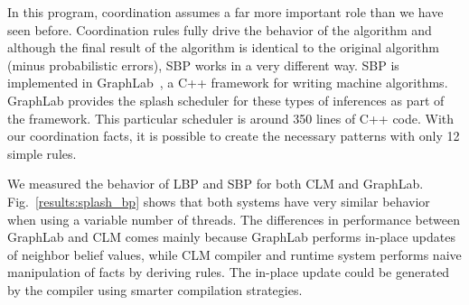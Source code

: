 \begin{dblfig}
   \begin{center}
   \end{center}
\end{dblfig}


In this program, coordination assumes a far more important role than we have
seen before. Coordination rules fully drive the behavior of the algorithm and
although the final result of the algorithm is identical to the original
algorithm (minus probabilistic errors), SBP works in a very different way.
SBP is implemented in GraphLab~\cite{GraphLab2010}, a C++ framework for writing machine algorithms.
GraphLab provides the splash scheduler for these types of inferences as part of
the framework. This particular scheduler is around 350 lines of C++ code.
With our coordination facts, it is possible to create the necessary
patterns with only 12 simple rules.

We measured the behavior of LBP and SBP for both CLM and GraphLab.
Fig.~\ref{results:splash_bp} shows that both systems have very similar behavior
when using a variable number of threads.  The differences in performance between
GraphLab and CLM comes mainly because GraphLab performs in-place updates of
neighbor belief values, while CLM compiler and runtime system performs naive
manipulation of facts by deriving rules. The in-place update could be generated
by the compiler using smarter compilation strategies.
